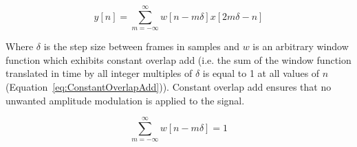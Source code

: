 		\begin{equation}
			y[n] = \sum_{m = -\infty}^{\infty} w[n - m\delta]x[2m\delta - n]
			\label{eq:STTR}
		\end{equation}

		Where $\delta$ is the step size between frames in samples and $w$ is an arbitrary window function which
		exhibits constant overlap add (i.e. the sum of the window function translated in time by all integer
		multiples of $\delta$ is equal to 1 at all values of $n$ (Equation~\ref{eq:ConstantOverlapAdd})).  Constant
		overlap add ensures that no unwanted amplitude modulation is applied to the signal.

		\begin{equation}
			\sum_{m = -\infty}^{\infty} w[n - m\delta] = 1
			\label{eq:ConstantOverlapAdd}
		\end{equation}
